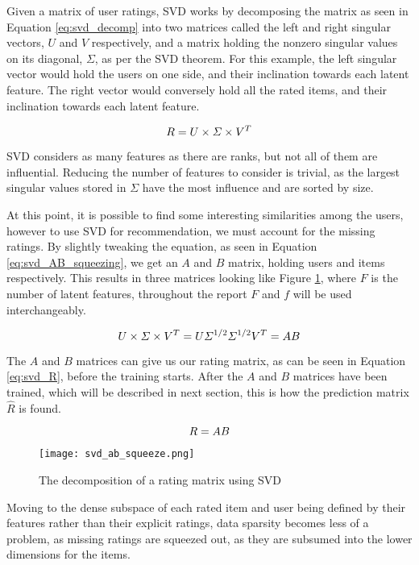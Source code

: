 Given a matrix of user ratings, SVD works by decomposing the matrix as seen in Equation \ref{eq:svd_decomp} into two matrices called the left and right singular vectors, $U$ and $V$ respectively, and a matrix holding the nonzero singular values on its diagonal, $\Sigma$, as per the SVD theorem\cite{svdtheorem}. For this example, the left singular vector would hold the users on one side, and their inclination towards each latent feature. The right vector would conversely hold all the rated items, and their inclination towards each latent feature\cite{linearalgebra_svd}\cite{recsys_svd}. 

\begin{equation} \label{eq:svd_decomp}
\centering
R = U\times \Sigma \times V^T
\end{equation}

SVD considers as many features as there are ranks, but not all of them are influential. Reducing the number of features to consider is trivial, as the largest singular values stored in $\Sigma$ have the most influence and are sorted by size.

At this point, it is possible to find some interesting similarities among the users, however to use SVD for recommendation, we must account for the missing ratings. By slightly tweaking the equation, as seen in Equation \ref{eq:svd_AB_squeezing}, we get an $A$ and $B$ matrix, holding users and items respectively. This results in three matrices looking like Figure \ref{fig:svdSqueeze}, where $F$ is the number of latent features, throughout the report $F$ and $f$ will be used interchangeably. 

\begin{equation}\label{eq:svd_AB_squeezing}
\centering
U\times \Sigma \times V^T = U\Sigma^{1/2} \Sigma^{1/2}V^T = AB
\end{equation}

The $A$ and $B$ matrices can give us our rating matrix, as can be seen in Equation \ref{eq:svd_R}, before the training starts. After the $A$ and $B$ matrices have been trained, which will be described in next section, this is how the prediction matrix $\hat{R}$ is found.

\begin{equation}\label{eq:svd_R}
\centering
R = AB
\end{equation}

\begin{figure}[H]
	\centering
	\texttt{[image: svd\_ab\_squeeze.png]}
	\caption{The decomposition of a rating matrix using SVD\cite{recsys_svd}}
	\label{fig:svdSqueeze}
\end{figure}
Moving to the dense subspace of each rated item and user being defined by their features rather than their explicit ratings, data sparsity becomes less of a problem, as missing ratings are squeezed out, as they are subsumed into the lower dimensions for the items.


